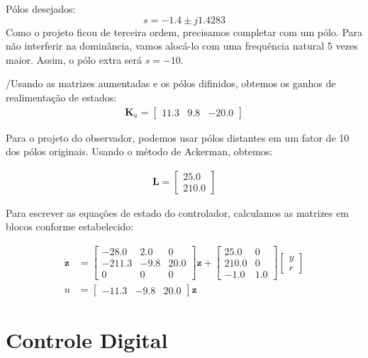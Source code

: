 \documentclass[
]{book}
\begin{document}
Pólos desejados:
\[
  s = -1.4 \pm j 1.4283
\]
Como o projeto ficou de terceira ordem, precisamos completar com um
pólo. Para não interferir na dominância, vamos alocá-lo com uma
frequência natural 5 vezes maior. Assim, o pólo extra será \(s=-10\).

/Usando as matrizes aumentadas e os pólos difinidos, obtemos os ganhos de realimentação de estados:
\begin{align}
  \mathbf{K}_a = \left[\begin{matrix}11.3 & 9.8 & -20.0\end{matrix}\right]
\end{align}

Para o projeto do observador, podemos usar pólos distantes em um fator de 10 dos pólos originais. Usando o método de Ackerman, obtemos:

\begin{align}
  \mathbf{L} = \left[\begin{matrix}25.0\\210.0\end{matrix}\right]
\end{align}

Para escrever as equações de estado do controlador, calculamos as matrizes em blocos conforme estabelecido:

\begin{align}
  \dot{\mathbf{z}} &= \left[\begin{matrix}-28.0 & 2.0 & 0\\-211.3 & -9.8 & 20.0\\0 & 0 & 0\end{matrix}\right] \mathbf{z} +  \left[\begin{matrix}25.0 & 0\\210.0 & 0\\-1.0 & 1.0\end{matrix}\right] \begin{bmatrix}y \\ r\end{bmatrix}\\
  u &= \left[\begin{matrix}-11.3 & -9.8 & 20.0\end{matrix}\right] \mathbf{z}
\end{align}

\hypertarget{controle-digital}{%
\chapter{Controle Digital}\label{controle-digital}}
\end{document}

